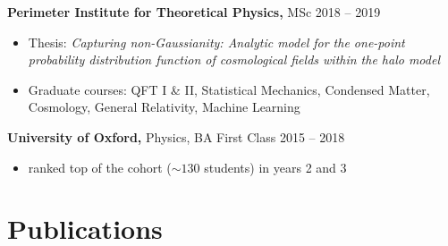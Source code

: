 \documentclass[margin]{res}
\begin{document}
\begin{resume}
	{\bf Perimeter Institute for Theoretical Physics,} MSc \hfill 2018 -- 2019
	\begin{itemize} \itemsep -2pt
		\item Thesis: \emph{Capturing non-Gaussianity: Analytic model for the one-point
		probability distribution function of cosmological fields within the halo model}
		\item Graduate courses: QFT I \& II, Statistical Mechanics, Condensed Matter,
		Cosmology, General Relativity, Machine Learning
	\end{itemize}

	{\bf University of Oxford,} Physics, BA First Class \hfill 2015 -- 2018
	\begin{itemize} \itemsep -2pt
		\item ranked top of the cohort ($\sim 130$ students) in years 2 and 3
	\end{itemize}

\section{Publications}


\newpage
\vspace*{0.5cm}


\end{resume}
\end{document}
